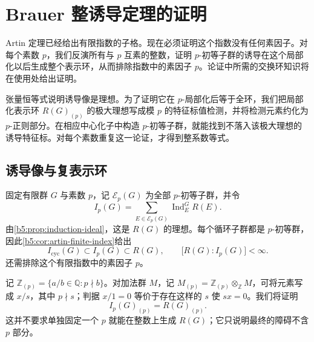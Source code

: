 ﻿%

\section{Brauer 整诱导定理的证明}
\label{b5:sec:0504}

Artin 定理已经给出有限指数的子格。现在必须证明这个指数没有任何素因子。对每个素数 \(p\)，我们反演所有与 \(p\) 互素的整数，证明 \(p\)-初等子群的诱导在这个局部化以后生成整个表示环，从而排除指数中的素因子 \(p\)。论证中所需的交换环知识将在使用处给出证明。

\ProseParagraphBreak
张量恒等式说明诱导像是理想。为了证明它在 \(p\)-局部化后等于全环，我们把局部化表示环 \(R(G)_{(p)}\) 的极大理想写成模 \(p\) 的特征标值检测，并将检测元素约化为 \(p\)-正则部分。在相应中心化子中构造 \(p\)-初等子群，就能找到不落入该极大理想的诱导特征标。对每个素数重复这一论证，才得到整系数等式。

\subsection{诱导像与复表示环}
\label{b5:subsec:0504:01}

固定有限群 \(G\) 与素数 \(p\)，记 \(\mathcal E_p(G)\) 为全部 \(p\)-初等子群，并令
\[
	I_p(G)=\sum_{E\in\mathcal E_p(G)}\operatorname{Ind}_E^G R(E).
\]
由\cref{b5:prop:induction-ideal}，这是 \(R(G)\) 的理想。每个循环子群都是 \(p\)-初等群，因此\cref{b5:cor:artin-finite-index}给出
\begin{equation}\label{b5:eq:artin-elementary-finite-index}
	I_{\mathrm{cyc}}(G)\subset I_p(G)\subset R(G), \qquad \bigl[R(G):I_p(G)\bigr]<\infty.
\end{equation}
还需排除这个有限指数中的素因子 \(p\)。

\ProseParagraphBreak
记 \(\mathbb Z_{(p)}=\{a/b\in\mathbb Q:p\nmid b\}\)。对加法群 \(M\)，记 \(M_{(p)}=\mathbb Z_{(p)}\otimes_{\mathbb Z}M\)，可将元素写成 \(x/s\)，其中 \(p\nmid s\)；判据 \(x/1=0\) 等价于存在这样的 \(s\) 使 \(sx=0\)。我们将证明
\[
	I_p(G)_{(p)}=R(G)_{(p)}.
\]
这并不要求单独固定一个 \(p\) 就能在整数上生成 \(R(G)\)；它只说明最终的障碍不含 \(p\) 部分。

